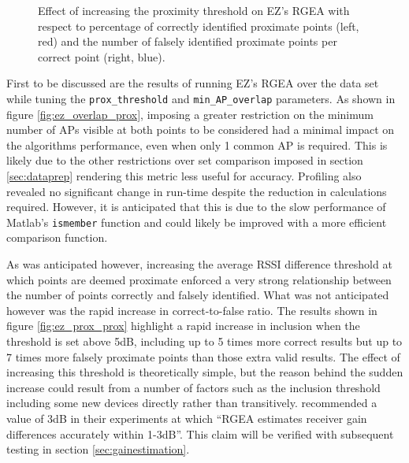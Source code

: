 \documentclass{UoYCSproject}
\begin{document}
\begin{figure}[h]
\begin{minipage}{0.5\textwidth}
                	\end{minipage}
                	\caption{Effect of increasing the proximity threshold on EZ's RGEA with respect to percentage of correctly identified proximate points (left, red) and the number of falsely identified proximate points per correct point (right, blue).}
                \end{figure}
                
                First to be discussed are the results of running EZ's RGEA over the data set while tuning the \texttt{prox\_threshold} and \texttt{min\_AP\_overlap} parameters. As shown in figure \ref{fig:ez_overlap_prox}, imposing a greater restriction on the minimum number of APs visible at both points to be considered had a minimal impact on the algorithms performance, even when only 1 common AP is required. This is likely due to the other restrictions over set comparison imposed in section \ref{sec:dataprep} rendering this metric less useful for accuracy. Profiling also revealed no significant change in run-time despite the reduction in calculations required. However, it is anticipated that this is due to the slow performance of Matlab's \texttt{ismember} function and could likely be improved with a more efficient comparison function.
                
                As was anticipated however, increasing the average RSSI difference threshold at which points are deemed proximate enforced a very strong relationship between the number of points correctly and falsely identified. What was not anticipated however was the rapid increase in correct-to-false ratio. The results shown in figure \ref{fig:ez_prox_prox} highlight a rapid increase in inclusion when the threshold is set above 5dB, including up to 5 times more correct results but up to 7 times more falsely proximate points than those extra valid results. The effect of increasing this threshold is theoretically simple, but the reason behind the sudden increase could result from a number of factors such as the inclusion threshold including some new devices directly rather than transitively. \citet{chintalapudi2010indoor} recommended a value of 3dB in their experiments at which ``RGEA estimates receiver gain differences accurately within 1-3dB''. This claim will be verified with subsequent testing in section \ref{sec:gainestimation}.
                
\end{document}
